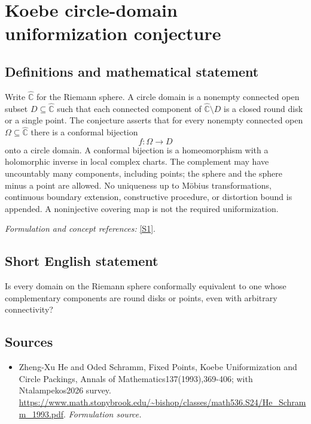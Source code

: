 \documentclass[11pt]{article}
\begin{document}
\section*{\texorpdfstring{Koebe circle-domain uniformization conjecture}{Koebe circle-domain uniformization conjecture}}\label{344}
\subsection{Definitions and mathematical statement}
Write $\widehat{{\mathbb{C}}}$ for the Riemann sphere. A circle domain is a nonempty connected open subset $D\subseteq\widehat{{\mathbb{C}}}$ such that each connected component of $\widehat{{\mathbb{C}}}\setminus D$ is a closed round disk or a single point. The conjecture asserts that for every nonempty connected open $\Omega\subseteq\widehat{{\mathbb{C}}}$ there is a conformal bijection
\[
 f:\Omega\longrightarrow D
\]
onto a circle domain. A conformal bijection is a homeomorphism with a holomorphic inverse in local complex charts. The complement may have uncountably many components, including points; the sphere and the sphere minus a point are allowed. No uniqueness up to M\"obius transformations, continuous boundary extension, constructive procedure, or distortion bound is appended. A noninjective covering map is not the required uniformization.
\par\smallskip\textit{Formulation and concept references:} \href{https://www.math.stonybrook.edu/~bishop/classes/math536.S24/He_Schramm_1993.pdf}{[S1]}.

\subsection{Short English statement}
Is every domain on the Riemann sphere conformally equivalent to one whose complementary components are round disks or points, even with arbitrary connectivity?
\subsection{Sources}
\begin{itemize}
\item[S1]Zheng-Xu He and Oded Schramm, Fixed Points, Koebe Uniformization and Circle Packings, Annals of Mathematics137(1993),369-406; with Ntalampekos2026 survey.
\url{https://www.math.stonybrook.edu/~bishop/classes/math536.S24/He_Schramm_1993.pdf}.
\textit{Formulation source.}
\end{itemize}
\end{document}
